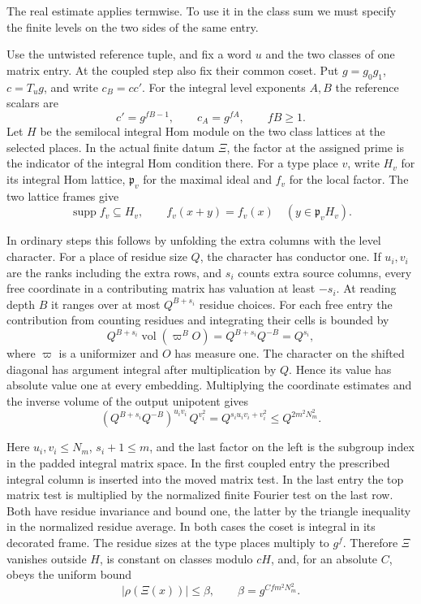 The real estimate applies termwise. To use it in the class sum we must specify the finite levels on the two sides of the same entry.

Use the untwisted reference tuple, and fix a word \(u\)
and the two classes of one matrix entry. At the coupled
step also fix their common coset. Put \(g=g_0g_1\),
\(c=T_u g\), and write \(c_B=cc'\). For the integral level exponents \(A,B\) the reference scalars are
\[
 c'=g^{fB-1},\qquad c_A=g^{fA},\qquad fB\ge1 .
\]
Let \(H\) be the semilocal integral Hom module on the two
class lattices at the selected places. In the actual
finite datum \(\Xi\), the factor at the assigned prime is the
indicator of the integral Hom condition there. For a type place \(v\), write \(H_v\) for its integral Hom lattice, \(\mathfrak p_v\) for the maximal ideal and \(f_v\) for the local factor. The two lattice frames give 
\[
 \operatorname{supp} f_v\subseteq H_v,\qquad f_v(x+y)=f_v(x)\quad(y\in\mathfrak p_vH_v).
\]

In ordinary
steps this follows by unfolding the extra columns with
the level character. For a place of residue size \(Q\),
the character has conductor one. If \(u_i,v_i\) are
the ranks including the extra rows, and \(s_i\) counts
extra source columns, every free coordinate in a
contributing matrix has valuation at least \(-s_i\).
At reading depth \(B\) it ranges over at most \(Q^{B+s_i}\)
residue choices. For each free entry the contribution from counting residues and
integrating their cells is bounded by
\[
 Q^{B+s_i}\operatorname{vol}(\varpi^B O)=Q^{B+s_i}Q^{-B}=Q^{s_i},
\]
where \(\varpi\) is a uniformizer and \(O\) has measure one.
The character on the shifted diagonal has argument integral after
multiplication by \(Q\). Hence its value has absolute value one at
every embedding. Multiplying the coordinate estimates and the inverse volume of
the output unipotent gives
\[
 (Q^{B+s_i}Q^{-B})^{u_i v_i}\,Q^{v_i^2}
     =Q^{s_i u_i v_i+v_i^2}\le Q^{2m^2N_m^2}.
\]

Here \(u_i,v_i\le N_m\), \(s_i+1\le m\), and the last factor
on the left is the subgroup index in the padded integral matrix space. In the first coupled entry the
prescribed integral column is inserted into the moved
matrix test. In the last entry the top matrix test is
multiplied by the normalized finite Fourier test on
the last row. Both have residue invariance and bound
one, the latter by the triangle inequality in the
normalized residue average. In both cases the coset
is integral in its decorated frame. The residue sizes
at the type places multiply to \(g^f\). Therefore \(\Xi\)
vanishes outside \(H\), is constant on classes modulo
\(cH\), and, for an absolute \(C\), obeys the uniform bound
\[
      |\rho(\Xi(x))|\le\beta,\qquad \beta=g^{C f m^2 N_m^2}.
\]
\label{cor:selected-kernel-jets-1}

